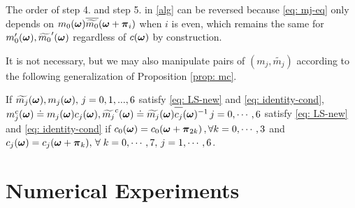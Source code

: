 The order of step 4. and step 5. in \ref{alg} can be reversed because \eqref{eq: mj-eq} only depends on $m_0(\boldsymbol{\omega})\overline{\widetilde{m_0}}(\boldsymbol{\omega} + \boldsymbol{\pi}_i)$ when $i$ is even, which remains the same for $m_0'(\boldsymbol{\omega}),\widetilde{m_0}'(\boldsymbol{\omega})$ regardless of $c(\boldsymbol{\omega})$ by construction.

It is not necessary, but we may also manipulate pairs of $(m_j,\widetilde{m_j})$ according to the following generalization of Proposition \ref{prop: mc}.
\begin{proposition}\label{prop: mjc}
If $\widetilde{m_{j}}(\boldsymbol{\omega}), m_j(\boldsymbol{\omega}),\,  j = 0,1,...,6$ satisfy \eqref{eq: LS-new} and \eqref{eq: identity-cond}, 
$m_j^c(\V{\omega})\doteq m_j(\V{\omega})c_j(\V{\omega}), \widetilde{m_j}^c(\V{\omega})\doteq \m{j}\overlinespace{c_j}(\V{\omega})^{-1} \, j = 0,\cdots,6$ 
satisfy \eqref{eq: LS-new} and \eqref{eq: identity-cond} if $ c_0(\boldsymbol{\omega}) = c_0(\boldsymbol{\omega}+\boldsymbol{\pi}_{2k})\,,\forall k = 0,\cdots,3$ and $c_j(\boldsymbol{\omega}) = c_j(\boldsymbol{\omega} + \boldsymbol{\pi}_k),\, \forall \;k = 0,\cdots,7,\, j = 1,\cdots,6$.
\end{proposition}

\begin{comment}
\subsection{solving $m_i$}
In the final step, we substitute $\mc{0}$ and $m_0^C(\V{\omega})$ into \eqref{eq: LS-new} and rewrite it into the following linear system,
\begin{align}\label{eq: mi}
\overline{\M}[:,2:7]\,\mathbf{m}[2:7](\V{\omega}) = 
\begin{bmatrix}
1-m_0^C\overline{\widetilde{m_0}^C}(\V{\omega})\\
0\\
-m_0^C\overline{\widetilde{m_0}^C}(\V{\omega}+\V{\pi}_2)\\
\vdots \\
0
\end{bmatrix}
=:\mathbf{b}(\V{\omega}).
\end{align}
The solution of \eqref{eq: mi} depends only on $m_0^C\overline{\widetilde{m_0}^C}$, or equivalently $m_0\overline{\widetilde{m_0}}$. 
\end{comment}

\section{Numerical Experiments}\label{sec: numerics}

